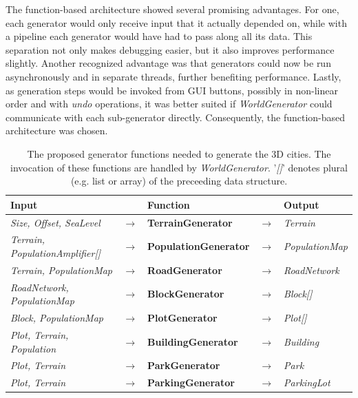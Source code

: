 The function-based architecture showed several promising advantages.
For one, each generator would only receive input that it actually depended on, while with a pipeline each generator would have had to pass along all its data.
This separation not only makes debugging easier, but it also improves performance slightly.
Another recognized advantage was that generators could now be run asynchronously and in separate threads, further benefiting performance.
Lastly, as generation steps would be invoked from GUI buttons, possibly in non-linear order and with \textit{undo} operations, it was better suited if \textit{WorldGenerator} could communicate with each sub-generator directly.
Consequently, the function-based architecture was chosen.

\begin{table}[H]
  \centering
  \begin{tabular}{lllll}
    \textbf{Input}                           &               & \textbf{Function}            &               & \textbf{Output}         \\
    \midrule
    \textit{Size, Offset, SeaLevel}          & $\rightarrow$ & \textbf{TerrainGenerator}    & $\rightarrow$ & \textit{Terrain}        \\
    \textit{Terrain, PopulationAmplifier[]}  & $\rightarrow$ & \textbf{PopulationGenerator} & $\rightarrow$ & \textit{PopulationMap}  \\
    \textit{Terrain, PopulationMap}          & $\rightarrow$ & \textbf{RoadGenerator}       & $\rightarrow$ & \textit{RoadNetwork}    \\
    \textit{RoadNetwork, PopulationMap}      & $\rightarrow$ & \textbf{BlockGenerator}      & $\rightarrow$ & \textit{Block[]}        \\
    \textit{Block, PopulationMap}            & $\rightarrow$ & \textbf{PlotGenerator}       & $\rightarrow$ & \textit{Plot[]}         \\
    \textit{Plot, Terrain, Population}       & $\rightarrow$ & \textbf{BuildingGenerator}   & $\rightarrow$ & \textit{Building}       \\
    \textit{Plot, Terrain}                   & $\rightarrow$ & \textbf{ParkGenerator}       & $\rightarrow$ & \textit{Park}           \\
    \textit{Plot, Terrain}                   & $\rightarrow$ & \textbf{ParkingGenerator}    & $\rightarrow$ & \textit{ParkingLot}     \\
    \bottomrule
  \end{tabular}

  \caption[]{The proposed generator functions needed to generate the 3D cities. The invocation of these functions are handled by \textit{WorldGenerator}. '\textit{[]}' denotes plural (e.g. list or array) of the preceeding data structure.}
  \label{table:generators}
\end{table}
\vspace{-0.4cm} %

